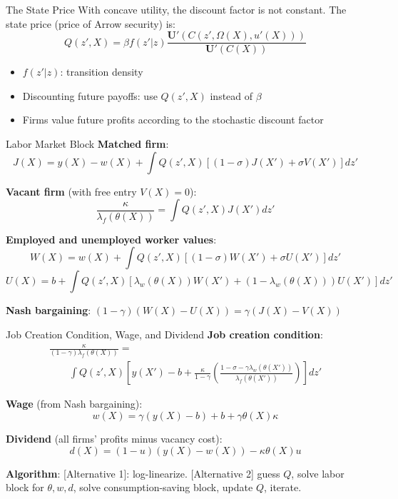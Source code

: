 \documentclass[blue]{beamer}
\begin{document}
\begin{frame}{The State Price}
	With concave utility, the discount factor is not constant. The state price (price of Arrow security) is:
	\[
	Q(z', X) = \beta f(z' | z) \frac{\mathbf{U}'(C(z', \Omega(X), u'(X)))}{\mathbf{U}'(C(X))}
	\]
	
	\bigskip
	\begin{itemize}
		\item $f(z' | z)$: transition density
		\item Discounting future payoffs: use $Q(z', X)$ instead of $\beta$
		\item Firms value future profits according to the stochastic discount factor
	\end{itemize}
	
\end{frame}



\begin{frame}{Labor Market Block}
	\textbf{Matched firm}:
	\[
	J(X) = y(X) - w(X) + \int Q(z', X)[(1 - \sigma) J(X') + \sigma V(X')] dz'
	\]
	
	\bigskip
	\textbf{Vacant firm} (with free entry $V(X) = 0$):
	\[
	\frac{\kappa}{\lambda_f(\theta(X))} = \int Q(z', X) J(X') dz'
	\]
	
	\bigskip
	\textbf{Employed and unemployed worker values}:
	\[
	W(X) = w(X) + \int Q(z', X)[(1 - \sigma) W(X') + \sigma U(X')] dz'
	\]
	\[
	U(X) = b + \int Q(z', X)[\lambda_w(\theta(X)) W(X') + (1 - \lambda_w(\theta(X))) U(X')] dz'
	\]
	
	\bigskip
	\textbf{Nash bargaining}: $(1 - \gamma)(W(X) - U(X)) = \gamma(J(X) - V(X))$
\end{frame}

\begin{frame}{Job Creation Condition, Wage, and Dividend}
	\textbf{Job creation condition}:
	\[
	\begin{array}{l}
	\displaystyle\frac{\kappa}{(1 - \gamma) \lambda_f(\theta(X))} =\\
	\quad\quad\displaystyle \int Q(z', X)\!\left[y(X') - b + \frac{\kappa}{1-\gamma}\!\left(\frac{1 - \sigma - \gamma \lambda_w(\theta(X'))}{\lambda_f(\theta(X'))}\right)\right] dz'
	\end{array}
	\]
	

	\textbf{Wage} (from Nash bargaining):
	\[
	{w(X) = \gamma(y(X) - b) + b + \gamma \theta(X) \kappa}
	\]
	

	\textbf{Dividend} (all firms' profits minus vacancy cost):
	\[
	d(X) = (1 - u)(y(X) - w(X)) - \kappa \theta(X) u
	\]
	
	\bigskip
	\textbf{Algorithm}: [Alternative 1]: log-linearize. [Alternative 2] guess $Q$, solve labor block for $\theta, w, d$, solve consumption-saving block, update $Q$, iterate.
\end{frame}
\end{document}
